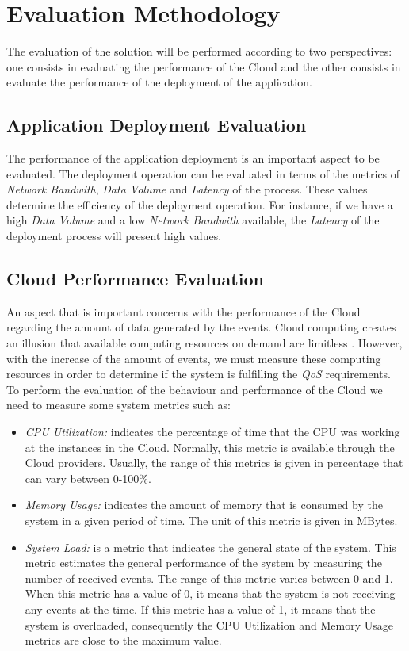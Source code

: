 \section{Evaluation Methodology}
\label{sec:evaluation}
The evaluation of the solution will be performed according to two perspectives: one consists in
evaluating the performance of the Cloud and the other consists in evaluate the performance
of the deployment of the application.
\subsection{Application Deployment Evaluation}
\label{sub:application_deployment_evaluation}
The performance of the application deployment is an important aspect to be evaluated.
The deployment operation can be evaluated in terms of the metrics of \textit{Network Bandwith},
\textit{Data Volume} and \textit{Latency} of the process. These values determine
the efficiency of the deployment operation. For instance, if we have a high \textit{Data Volume}
and a low \textit{Network Bandwith} available, the \textit{Latency} of the deployment process
will present high values.     
\subsection{Cloud Performance Evaluation}
\label{subs:cloud_performance_evaluation}
An aspect that is important concerns with the performance of the Cloud regarding the amount
of data generated by the events. Cloud computing creates an illusion that available computing
resources on demand are limitless \cite{armbrust2009m}. However, with the increase of the amount of
events, we must measure these computing resources in order to determine if the system is fulfilling
the \textit{QoS} requirements. To perform the evaluation of the behaviour and performance of the Cloud
we need to measure some system metrics such as:
\begin{itemize}
  \item \textit{CPU Utilization:} indicates the percentage of time that the CPU was working at
  the instances in the Cloud. Normally, this metric is available through the Cloud providers.
  Usually, the range of this metrics is given in percentage that can vary between 0-100\%.
  \item \textit{Memory Usage:} indicates the amount of memory that is consumed by the system in a
  given period of time. The unit of this metric is given in MBytes.
  \item \textit{System Load:} is a metric that indicates the general state of the system.
  This metric estimates the general performance of the system by measuring the number of received events.
  The range of this metric varies between 0 and 1. When this metric has a value of 0, it means that the
  system is not receiving any events at the time. If this metric has a value of 1, it means that the system
  is overloaded, consequently the CPU Utilization and Memory Usage metrics are close to the maximum value.
\end{itemize}

